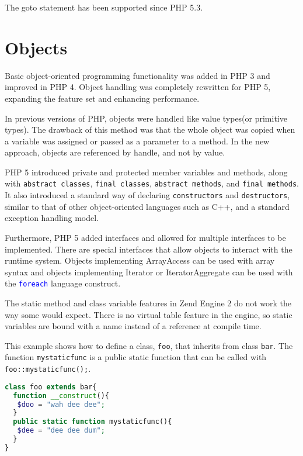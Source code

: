 The goto statement has been supported since PHP 5.3.




\chapter{Objects}


Basic object-oriented programming functionality was added in PHP 3 and improved in PHP 4. Object handling was completely rewritten for PHP 5, expanding the feature set and enhancing performance. 

In previous versions of PHP, objects were handled like value types(or primitive types). The drawback of this method was that the whole object was copied when a variable was assigned or passed as a parameter to a method. In the new approach, objects are referenced by handle, and not by value. 

PHP 5 introduced private and protected member variables and methods, along with \texttt{abstract classes}, \texttt{final classes}, \texttt{abstract methods}, and \texttt{final methods}. It also introduced a standard way of declaring \texttt{constructors} and \texttt{destructors}, similar to that of other object-oriented languages such as C++, and a standard exception handling model. 

Furthermore, PHP 5 added interfaces and allowed for multiple interfaces to be implemented. There are special interfaces that allow objects to interact with the runtime system. Objects implementing ArrayAccess can be used with array syntax and objects implementing Iterator or IteratorAggregate can be used with the \textcolor{Blue}{\texttt{foreach}} language construct. 

The static method and class variable features in Zend Engine 2 do not work the way some would expect. There is no virtual table feature in the engine, so static variables are bound with a name instead of a reference at compile time.


This example shows how to define a class, \texttt{foo}, that inherits from class \texttt{bar}. The function \texttt{mystaticfunc} is a public static function that can be called with \texttt{foo::mystaticfunc();}.


\begin{lstlisting}[language=PHP]
class foo extends bar{
  function __construct(){
   $doo = "wah dee dee";
  }
  public static function mystaticfunc(){
   $dee = "dee dee dum";
  }
}
\end{lstlisting}



